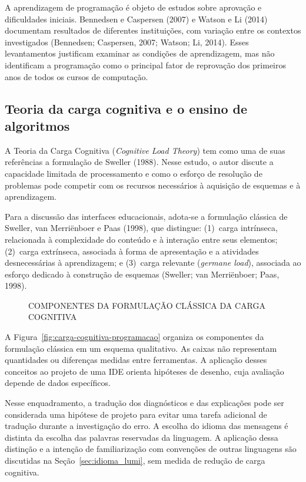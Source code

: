 \documentclass[
    12pt
    ,oneside
    ,a4paper
    ,chapter=TITLE
    ,section=TITLE
    ,sumario=abnt-6027-2012]{abntex2}
\newcommand{\textSweller}{Sweller (1988)\xspace}
\newcommand{\citeTaxas}{(Bennedsen; Caspersen, 2007; Watson; Li, 2014)}
\newcommand{\citeCarga}{(Sweller; van Merriënboer; Paas, 1998)}
\renewcommand{\legenda}[2][]{%
    \centering
    \caption[\MakeTextUppercase{#2}]{\maybeLabel{#1}\MakeTextUppercase{#2}}%
}
\begin{document}
A aprendizagem de programação é objeto de estudos sobre aprovação e dificuldades
iniciais. Bennedsen e Caspersen (2007) e Watson e Li (2014) documentam resultados
de diferentes instituições, com variação entre os contextos investigados
\citeTaxas. Esses levantamentos justificam examinar as
condições de aprendizagem, mas não identificam a programação como o principal
fator de reprovação dos primeiros anos de todos os cursos de computação.
\subsection{Teoria da carga cognitiva e o ensino de algoritmos}

A Teoria da Carga Cognitiva (\textit{Cognitive Load Theory}) tem como uma de suas
referências a formulação de \textSweller. Nesse estudo, o autor discute a capacidade
limitada de processamento e como o esforço de resolução de problemas pode competir com
os recursos necessários à aquisição de esquemas e à aprendizagem.

Para a discussão das interfaces educacionais, adota-se a formulação clássica de
Sweller, van Merriënboer e Paas (1998), que distingue: (1)~carga intrínseca, relacionada
à complexidade do conteúdo e à interação entre seus elementos; (2)~carga extrínseca,
associada à forma de apresentação e a atividades desnecessárias à aprendizagem; e
(3)~carga relevante (\textit{germane load}), associada ao esforço dedicado à construção de esquemas \citeCarga.

\begin{figure}[htb]
\centering
\legenda[fig:carga-cognitiva-programacao]{Componentes da formulação clássica da carga cognitiva}

\end{figure}

A Figura~\ref{fig:carga-cognitiva-programacao} organiza os componentes da formulação
clássica em um esquema qualitativo. As caixas não representam quantidades ou
diferenças medidas entre ferramentas. A aplicação desses conceitos ao projeto de
uma IDE orienta hipóteses de desenho, cuja avaliação depende de dados específicos.

Nesse enquadramento, a tradução dos diagnósticos e das explicações pode ser
considerada uma hipótese de projeto para evitar uma tarefa adicional de tradução
durante a investigação do erro. A escolha do idioma das mensagens é distinta da
escolha das palavras reservadas da linguagem. A aplicação dessa distinção e a
intenção de familiarização com convenções de outras linguagens são discutidas
na Seção~\ref{sec:idioma_lumi}, sem medida de redução de carga cognitiva.
\end{document}
